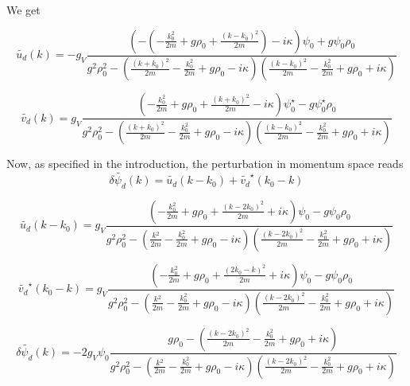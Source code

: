 \documentclass[a4paper,prb,10pt,aps]{revtex4-1}
\begin{document}
We get

\begin{equation}
  \label{eq:34}
\widetilde{u_{d}}(k)=-g_{V}\frac{\left(-\left(-\frac{k_{0}^{2}}{2m}+g\rho_{0}+\frac{(k-k_{0})^{2}}{2m}\right)-i\kappa\right)\psi_{0}+g\psi_{0}\rho_{0}}{g^{2}\rho_{0}^{2}-\left(\frac{(k+k_{0})^{2}}{2m}-\frac{k_{0}^{2}}{2m}+g\rho_{0}-i\kappa\right)\left(\frac{(k-k_{0})^{2}}{2m}-\frac{k_{0}^{2}}{2m}+g\rho_{0}+i\kappa\right)}  
\end{equation}

\begin{equation}
  \label{eq:35}
\widetilde{v_{d}}(k)=g_{V}\frac{\left(-\frac{k_{0}^{2}}{2m}+g\rho_{0}+\frac{(k+k_{0})^{2}}{2m}-i\kappa\right)\psi_{0}^{\star}-g\psi_{0}^{\star}\rho_{0}}{g^{2}\rho_{0}^{2}-\left(\frac{(k+k_{0})^{2}}{2m}-\frac{k_{0}^{2}}{2m}+g\rho_{0}-i\kappa\right)\left(\frac{(k-k_{0})^{2}}{2m}-\frac{k_{0}^{2}}{2m}+g\rho_{0}+i\kappa\right)}  
\end{equation}


Now, as specified in the introduction, the perturbation in momentum space reads 
\begin{equation}
  \label{eq:36}
\delta\widetilde{\psi_{d}}(k)=\widetilde{u_{d}}(k-k_{0})+\widetilde{v_{d}}^{\star}(k_{0}-k)  
\end{equation}

\begin{equation}
  \label{eq:37}
\widetilde{u_{d}}(k-k_{0})=g_{V}\frac{\left(-\frac{k_{0}^{2}}{2m}+g\rho_{0}+\frac{(k-2k_{0})^{2}}{2m}+i\kappa\right)\psi_{0}-g\psi_{0}\rho_{0}}{g^{2}\rho_{0}^{2}-\left(\frac{k{}^{2}}{2m}-\frac{k_{0}^{2}}{2m}+g\rho_{0}-i\kappa\right)\left(\frac{(k-2k_{0})^{2}}{2m}-\frac{k_{0}^{2}}{2m}+g\rho_{0}+i\kappa\right)}  
\end{equation}


\begin{equation}
  \label{eq:38}
\widetilde{v_{d}}^{\star}(k_{0}-k)=g_{V}\frac{\left(-\frac{k_{0}^{2}}{2m}+g\rho_{0}+\frac{(2k_{0}-k)^{2}}{2m}+i\kappa\right)\psi_{0}-g\psi_{0}\rho_{0}}{g^{2}\rho_{0}^{2}-\left(\frac{k{}^{2}}{2m}-\frac{k_{0}^{2}}{2m}+g\rho_{0}-i\kappa\right)\left(\frac{(k-2k_{0})^{2}}{2m}-\frac{k_{0}^{2}}{2m}+g\rho_{0}+i\kappa\right)}  
\end{equation}

\begin{equation}
  \label{eq:39}
\delta\widetilde{\psi_{d}}(k)=-2g_{V}\psi_{0}\frac{g\rho_{0}-\left(\frac{(k-2k_{0})^{2}}{2m}-\frac{k_{0}^{2}}{2m}+g\rho_{0}+i\kappa\right)}{g^{2}\rho_{0}^{2}-\left(\frac{k{}^{2}}{2m}-\frac{k_{0}^{2}}{2m}+g\rho_{0}-i\kappa\right)\left(\frac{(k-2k_{0})^{2}}{2m}-\frac{k_{0}^{2}}{2m}+g\rho_{0}+i\kappa\right)}  
\end{equation}
\end{document}
